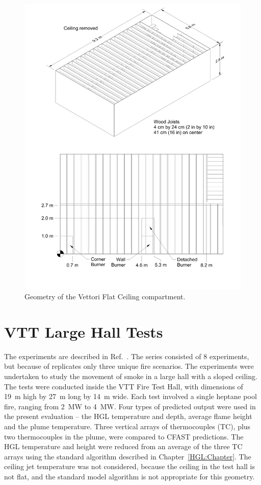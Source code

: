 \begin{figure}[\figoptions{b}]
\begin{center}
\includegraphics[width=6.5in]{FIGURES/Vettori_Flat/Vettori_Flat_Ceiling}
\end{center}
\caption[Geometry of the Vettori Flat Ceiling compartment]{Geometry of the Vettori Flat Ceiling compartment.}
\label{Vettori_Drawing}
\end{figure}

\section{VTT Large Hall Tests}

The experiments are described in Ref.~\cite{Hostikka:2001}. The series consisted of 8 experiments, but because of replicates only three unique fire scenarios. The experiments were undertaken to study the movement of smoke in a large hall with a sloped ceiling. The tests were conducted inside the VTT Fire Test Hall, with dimensions of 19~m high by 27~m long by 14~m wide. Each test involved a single heptane pool fire, ranging from 2~MW to 4~MW. Four types of predicted output were used in the present evaluation -- the HGL temperature and depth, average flame height and the plume temperature. Three vertical arrays of thermocouples (TC), plus two thermocouples in the plume, were compared to CFAST predictions. The HGL temperature and height were reduced from an average of the three TC arrays using the standard algorithm described in Chapter~\ref{HGL:Chapter}. The ceiling jet temperature was not considered, because the ceiling in the test hall is not flat, and the standard model algorithm is not appropriate for this geometry.

